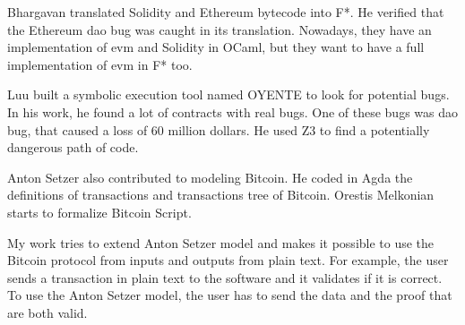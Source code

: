 Bhargavan \cite{bhargavan2016formal} translated Solidity and Ethereum bytecode into F*.
He verified that the Ethereum \gls{dao} bug was caught in its translation.
Nowadays, they have an implementation of \gls{evm} and Solidity in OCaml,
but they want to have a full implementation of \gls{evm} in F* too.

Luu \cite{luu2016making} built a symbolic execution tool named OYENTE to look for potential bugs.
In his work, he found a lot of contracts with real bugs.
One of these bugs was \gls{dao} bug, that caused a loss of 60 million dollars.
He used Z3 to find a potentially dangerous path of code.

Anton Setzer \cite{setzer2018modelling} also contributed to modeling Bitcoin.
He coded in Agda the definitions of transactions and
transactions tree of Bitcoin.
Orestis Melkonian starts to formalize Bitcoin Script.

My work tries to extend Anton Setzer model and makes it possible to use the Bitcoin protocol
from inputs and outputs from plain text.
For example, the user sends a transaction in plain text to the software and it validates if it is correct.
To use the Anton Setzer model, the user has to send the data and the proof that are both valid.
